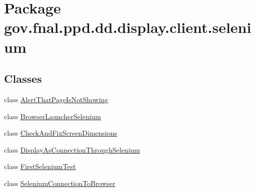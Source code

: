 \hypertarget{namespacegov_1_1fnal_1_1ppd_1_1dd_1_1display_1_1client_1_1selenium}{\section{Package gov.\-fnal.\-ppd.\-dd.\-display.\-client.\-selenium}
\label{namespacegov_1_1fnal_1_1ppd_1_1dd_1_1display_1_1client_1_1selenium}
}
\subsection*{Classes}
\begin{DoxyCompactItemize}
\item 
class \hyperlink{classgov_1_1fnal_1_1ppd_1_1dd_1_1display_1_1client_1_1selenium_1_1AlertThatPageIsNotShowing}{Alert\-That\-Page\-Is\-Not\-Showing}
\item 
class \hyperlink{classgov_1_1fnal_1_1ppd_1_1dd_1_1display_1_1client_1_1selenium_1_1BrowserLauncherSelenium}{Browser\-Launcher\-Selenium}
\item 
class \hyperlink{classgov_1_1fnal_1_1ppd_1_1dd_1_1display_1_1client_1_1selenium_1_1CheckAndFixScreenDimensions}{Check\-And\-Fix\-Screen\-Dimensions}
\item 
class \hyperlink{classgov_1_1fnal_1_1ppd_1_1dd_1_1display_1_1client_1_1selenium_1_1DisplayAsConnectionThroughSelenium}{Display\-As\-Connection\-Through\-Selenium}
\item 
class \hyperlink{classgov_1_1fnal_1_1ppd_1_1dd_1_1display_1_1client_1_1selenium_1_1FirstSeleniumTest}{First\-Selenium\-Test}
\item 
class \hyperlink{classgov_1_1fnal_1_1ppd_1_1dd_1_1display_1_1client_1_1selenium_1_1SeleniumConnectionToBrowser}{Selenium\-Connection\-To\-Browser}
\end{DoxyCompactItemize}
